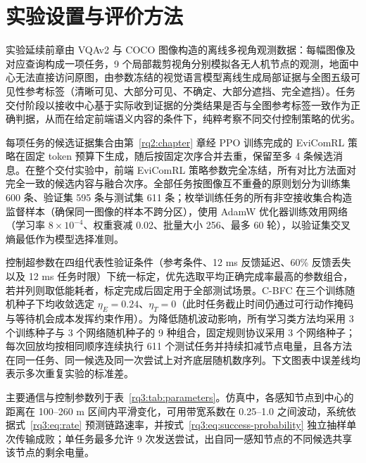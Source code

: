 \section{实验设置与评价方法}
\label{rq3:subsec:experiment-data}
\label{rq3:subsec:experiment-settings}
\label{rq3:subsec:baselines}
\label{rq3:sec:experiments}

实验延续前章由 VQAv2 与 COCO 图像构造的离线多视角观测数据\citep{coco,vqa-v2}：每幅图像及对应查询构成一项任务，9 个局部裁剪视角分别模拟各无人机节点的观测，地面中心无法直接访问原图，由参数冻结的视觉语言模型离线生成局部证据与全图五级可见性参考标签（清晰可见、大部分可见、不确定、大部分遮挡、完全遮挡）。任务交付阶段以接收中心基于实际收到证据的分类结果是否与全图参考标签一致作为正确判据，从而在给定前端语义内容的条件下，纯粹考察不同交付控制策略的优劣。

每项任务的候选证据集合由第~\ref{rq2:chapter} 章经 PPO 训练完成的 EviComRL 策略在固定 token 预算下生成\citep{ppo}，随后按固定次序合并去重，保留至多 4 条候选消息。在整个交付实验中，前端 EviComRL 策略参数完全冻结，所有对比方法面对完全一致的候选内容与融合次序。全部任务按图像互不重叠的原则划分为训练集 600 条、验证集 595 条与测试集 611 条；枚举训练任务的所有非空接收集合构造监督样本（确保同一图像的样本不跨分区），使用 AdamW 优化器训练效用网络（学习率 $8\times10^{-4}$、权重衰减 0.02、批量大小 256、最多 60 轮），以验证集交叉熵最低作为模型选择准则。

控制超参数在四组代表性验证条件（参考条件、12 ms 反馈延迟、60\% 反馈丢失以及 12 ms 任务时限）下统一标定，优先选取平均正确完成率最高的参数组合，若并列则取低能耗者，标定完成后固定用于全部测试场景。C-BFC 在三个训练随机种子下均收敛选定 $\eta_E=0.24$、$\eta_T=0$（此时任务截止时间仍通过可行动作掩码与等待机会成本发挥约束作用）。为降低随机波动影响，所有学习类方法均采用 3 个训练种子与 3 个网络随机种子的 9 种组合，固定规则协议采用 3 个网络种子；每次回放均按相同顺序连续执行 611 个测试任务并持续扣减节点电量，且各方法在同一任务、同一候选及同一次尝试上对齐底层随机数序列。下文图表中误差线均表示多次重复实验的标准差。

主要通信与控制参数列于表~\ref{rq3:tab:parameters}。仿真中，各感知节点到中心的距离在 100--260 m 区间内平滑变化，可用带宽系数在 0.25--1.0 之间波动，系统依据式~\eqref{rq3:eq:rate} 预测链路速率，并按式~\eqref{rq3:eq:success-probability} 独立抽样单次传输成败；单任务最多允许 9 次发送尝试，出自同一感知节点的不同候选共享该节点的剩余电量。


